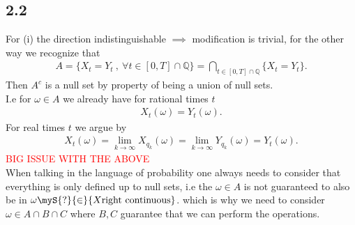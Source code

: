 \subsection*{2.2}
For (i) the direction  indistinguishable $\implies$  modification is trivial, for the other way we recognize that 
\begin{align*}
  A = \{X_t = Y_t \ ,\ \forall t \in [0,T] \cap \mathbb{Q} \}   = \bigcap_{t \in [0,T] \cap \mathbb{Q}} \{X_t = Y_t\} 
.\end{align*}
Then $A^{c} $ is a null set by property of being a union of null sets.\\
I.e for $\omega  \in  A$ we already have for rational times $t$
\begin{align*}
  X_t(\omega ) = Y_t(\omega )
.\end{align*}
For real times $t$ we argue by 
\begin{align*}
  X_t(\omega ) = \lim_{k\to \infty} X_{q_k}(\omega ) = \lim_{k\to \infty} Y_{q_k}(\omega ) = Y_t(\omega )
.\end{align*}
\textcolor{Red}{BIG ISSUE WITH THE ABOVE} \\
When talking in the language of probability one always needs to consider that everything is only defined up to null sets, i.e the $\omega  \in  A$ is not guaranteed 
to also be in $\omega  \myS{?}{\in } \{X \text{right continuous}\}  $. which is why we need to consider $\omega  \in  A \cap B \cap C$ where $B,C$ guarantee 
that we can perform the operations.
